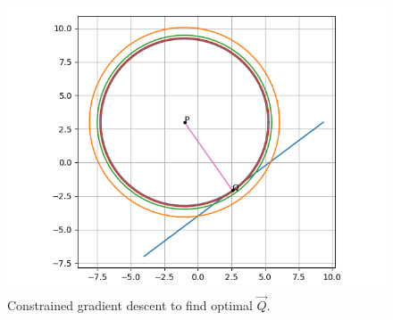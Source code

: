 \documentclass[journal,12pt,twocolumn]{IEEEtran}
\begin{document}
\begin{enumerate}
\begin{figure}[!ht]
        \includegraphics[width=\columnwidth]{figs/gd_lagrange.png}
        \caption{Constrained gradient descent to find optimal $\vec{Q}$.}
        \label{fig:gd-lag}
    \end{figure}
\end{enumerate}
\end{document}
